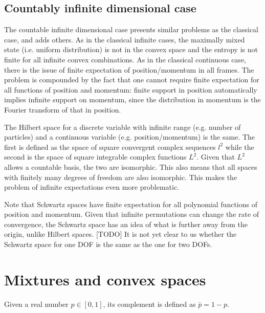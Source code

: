 \subsection{Countably infinite dimensional case}

The countable infinite dimensional case presents similar problems as the classical case, and adds others. As in the classical infinite cases, the maximally mixed state (i.e. uniform distribution) is not in the convex space and the entropy is not finite for all infinite convex combinations. As in the classical continuous case, there is the issue of finite expectation of position/momentum in all frames. The problem is compounded by the fact that one cannot require finite expectation for all functions of position and momentum: finite support in position automatically implies infinite support on momentum, since the distribution in momentum is the Fourier transform of that in position.

The Hilbert space for a discrete variable with infinite range (e.g. number of particles) and a continuous variable (e.g. position/momentum) is the same. The first is defined as the space of square convergent complex sequences $l^2$ while the second is the space of square integrable complex functions $L^2$. Given that $L^2$ allows a countable basis, the two are isomorphic. This also means that all spaces with finitely many degrees of freedom are also isomorphic. This makes the problem of infinite expectations even more problematic.

Note that Schwartz spaces have finite expectation for all polynomial functions of position and momentum. Given that infinite permutations can change the rate of convergence, the Schwartz space has an idea of what is further away from the origin, unlike Hilbert spaces. [TODO] It is not yet clear to us whether the Schwartz space for one DOF is the same as the one for two DOFs.

\section{Mixtures and convex spaces}



\begin{defn}
	Given a real number $p \in [0,1]$, its complement is defined as $\bar{p} = 1-p$.
\end{defn}

